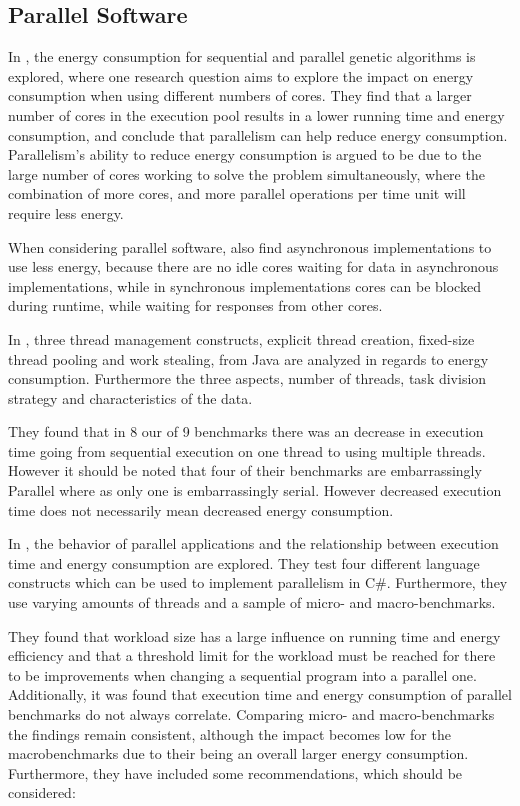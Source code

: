 \subsection{Parallel Software}

In \cite{abdelhafez2019}, the energy consumption for sequential and parallel genetic algorithms is explored, where one research question aims to explore the impact on energy consumption when using different numbers of cores. They find that a larger number of cores in the execution pool results in a lower running time and energy consumption, and conclude that parallelism can help reduce energy consumption. Parallelism's ability to reduce energy consumption is argued to be due to the large number of cores working to solve the problem simultaneously, where the combination of more cores, and more parallel operations per time unit will require less energy.

When considering parallel software, \cite{abdelhafez2019} also find asynchronous implementations to use less energy, because there are no idle cores waiting for data in asynchronous implementations, while in synchronous implementations cores can be blocked during runtime, while waiting for responses from other cores. 


In \cite{Pinto2014}, three thread management constructs, explicit thread creation, fixed-size thread pooling and work stealing, from Java are analyzed in regards to energy consumption. Furthermore the three aspects, number of threads, task division strategy and characteristics of the data. 

They found that in 8 our of 9 benchmarks there was an decrease in execution time going from sequential execution on one thread to using multiple threads. However it should be noted that four of their benchmarks are embarrassingly Parallel where as only one is embarrassingly serial. However decreased execution time does not necessarily mean decreased energy consumption.



In \cite{Lindholt}, the behavior of parallel applications and the relationship between execution time and energy consumption are explored. They test four different language constructs which can be used to implement parallelism in C\#. Furthermore, they use varying amounts of threads and a sample of micro- and macro-benchmarks. \cite{Lindholt}

They found that workload size has a large influence on running time and energy efficiency and that a threshold limit for the workload must be reached for there to be improvements when changing a sequential program into a parallel one.  Additionally, it was found that execution time and energy consumption of parallel benchmarks do not always correlate.  Comparing micro- and macro-benchmarks the findings remain consistent, although the impact becomes low for the macrobenchmarks due to their being an overall larger energy consumption. Furthermore, they have included some recommendations, which should be considered:\cite{Lindholt}

